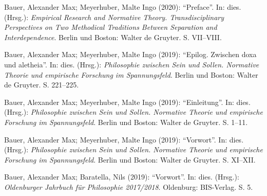 \documentclass[a4paper,10pt]{article}
\newenvironment{literature}{%
   \parskip6pt\parindent0pt\raggedright
   \def\lititem{\hangindent=1cm\hangafter1}}{%
   \par\ignorespaces}
\begin{document}
\begin{literature}
\lititem Bauer, Alexander Max; Meyerhuber, Malte Ingo (2020): \enquote{Preface}. In: dies. (Hrsg.): \textit{Empirical Research and Normative Theory. Transdisciplinary Perspectives on Two Methodical Traditions Between Separation and Interdependence}. Berlin und Boston: Walter de Gruyter. S. VII--VIII.

\lititem Bauer, Alexander Max; Meyerhuber, Malte Ingo (2019): \enquote{Epilog. Zwischen doxa und aletheia}. In: dies. (Hrsg.): \textit{Philosophie zwischen Sein und Sollen. Normative Theorie und empirische Forschung im Spannungsfeld}. Berlin und Boston: Walter de Gruyter. S. 221--225.

\lititem Bauer, Alexander Max; Meyerhuber, Malte Ingo (2019): \enquote{Einleitung}. In: dies. (Hrsg.): \textit{Philosophie zwischen Sein und Sollen. Normative Theorie und empirische Forschung im Spannungsfeld}. Berlin und Boston: Walter de Gruyter. S. 1--11.

\lititem Bauer, Alexander Max; Meyerhuber, Malte Ingo (2019): \enquote{Vorwort}. In: dies. (Hrsg.): \textit{Philosophie zwischen Sein und Sollen. Normative Theorie und empirische Forschung im Spannungsfeld}. Berlin und Boston: Walter de Gruyter. S. XI--XII.

\lititem Bauer, Alexander Max; Baratella, Nils (2019): \enquote{Vorwort}. In: dies. (Hrsg.): \textit{Oldenburger Jahrbuch für Philosophie 2017/2018}. Oldenburg: BIS-Verlag. S. 5.
\end{literature}


\end{document}
